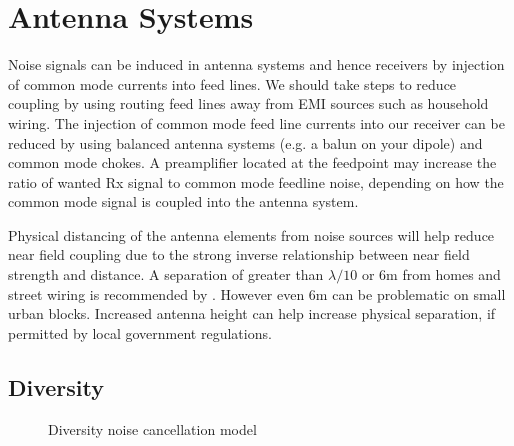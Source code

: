 \documentclass{article}
\begin{document}
\section{Antenna Systems}

Noise signals can be induced in antenna systems and hence receivers by injection of common mode currents into feed lines. We should take steps to reduce coupling by using routing feed lines away from EMI sources such as household wiring.  The injection of common mode feed line currents into our receiver can be reduced by using balanced antenna systems (e.g. a balun on your dipole) and common mode chokes. A preamplifier located at the feedpoint may increase the ratio of wanted Rx signal to common mode feedline noise, depending on how the common mode signal is coupled into the antenna system. 

Physical distancing of the antenna elements from noise sources will help reduce near field coupling due to the strong inverse relationship between near field strength and distance.  A separation of greater than $\lambda/10$ or 6m from homes and street wiring is recommended by \cite{lz1aq}\cite{wellbrook}\cite{w8ji_radio_noise}.  However even 6m can be problematic on small urban blocks.  Increased antenna height can help increase physical separation, if permitted by local government regulations.

\subsection{Diversity}

\begin{figure}[h]
\caption{Diversity noise cancellation model}
\label{fig:diveristy_model}
\begin{center}
\end{center}
\end{figure}
\end{document}
